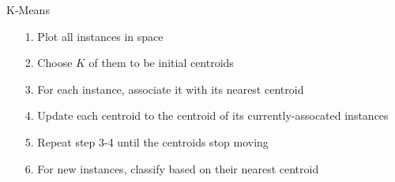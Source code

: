 \documentclass[11pt,letterpaper]{article}
\begin{document}
K-Means

\begin{itemize}
  \item[1.] Plot all instances in space
  \item[2.] Choose $K$ of them to be initial centroids
  \item[3.] For each instance, associate it with its nearest centroid
  \item[4.] Update each centroid to the centroid of its currently-assocated instances
  \item[5.] Repeat step 3-4 until the centroids stop moving
  \item[6.] For new instances, classify based on their nearest centroid
\end{itemize}
\end{document}
